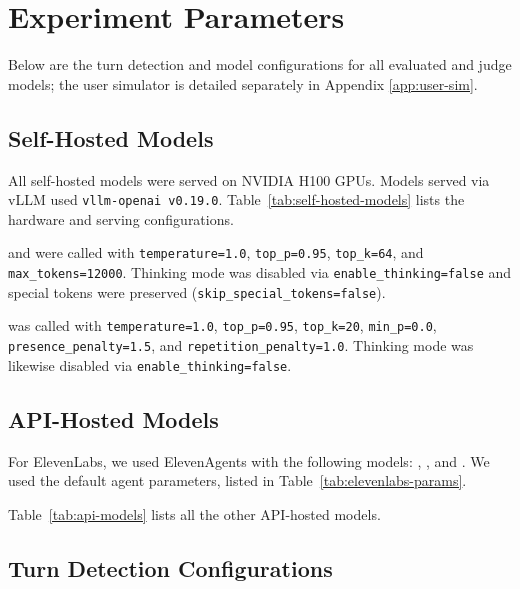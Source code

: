 \newpage
\clearpage
\section{Experiment Parameters}
\label{app:models-configuration}

Below are the turn detection and model configurations for all evaluated and judge models; the user simulator is detailed separately in Appendix \ref{app:user-sim}.

\subsection{Self-Hosted Models}
\label{appendix:self-hosted}

All self-hosted models were served on NVIDIA H100 GPUs. Models served via vLLM used \texttt{vllm-openai v0.19.0}. Table~\ref{tab:self-hosted-models} lists the hardware and serving configurations.

\textbf{\gemmaAfull} and \textbf{\gemmaBfull} were called with \texttt{temperature=1.0}, \texttt{top\_p=0.95}, \texttt{top\_k=64}, and \texttt{max\_tokens=12000}. Thinking mode was disabled via \texttt{enable\_thinking=false} and special tokens were preserved (\texttt{skip\_special\_tokens=false}).

\textbf{\qwenfull} was called with \texttt{temperature=1.0}, \texttt{top\_p=0.95}, \texttt{top\_k=20}, \texttt{min\_p=0.0}, \texttt{presence\_penalty=1.5}, and \texttt{repetition\_penalty=1.0}. Thinking mode was likewise disabled via \texttt{enable\_thinking=false}.



\subsection{API-Hosted Models}
\label{appendix:api-models}

For ElevenLabs, we used ElevenAgents with the following models: \scribefull, \geminiflashfull, and \conversationalfull. We used the default agent parameters, listed in Table~\ref{tab:elevenlabs-params}.



Table~\ref{tab:api-models} lists all the other API-hosted models.

\subsection{Turn Detection Configurations}

